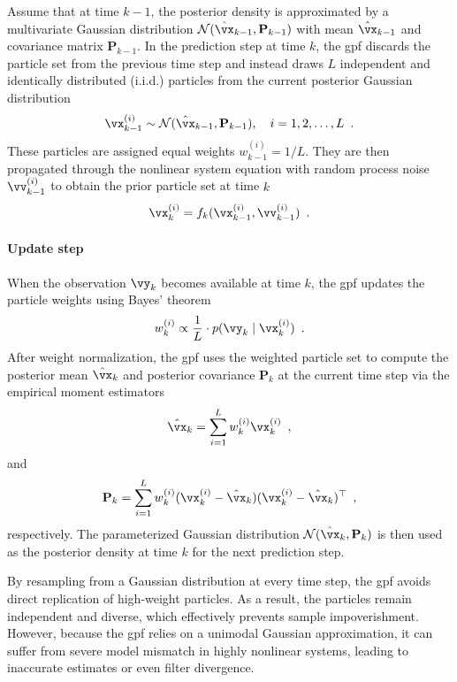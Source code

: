 Assume that at time $k-1$, the posterior density is approximated by a multivariate Gaussian distribution $\mathcal{N}(\hat{\vx}_{k-1}, \mathbf{P}_{k-1})$ with mean $\hat{\vx}_{k-1}$ and covariance matrix $\mathbf{P}_{k-1}$. In the prediction step at time $k$, the \ac{gpf} discards the particle set from the previous time step and instead draws $L$ independent and identically distributed (i.i.d.) particles from the current posterior Gaussian distribution
\begin{equation}
	\vx_{k-1}^{(i)} \sim \mathcal{N}(\hat{\vx}_{k-1}, \mathbf{P}_{k-1}), \quad i = 1, 2, \dots, L\enspace.
\end{equation}
These particles are assigned equal weights $w_{k-1}^{(i)} = 1/L$. They are then propagated through the nonlinear system equation with random process noise $\vv_{k-1}^{(i)}$ to obtain the prior particle set at time $k$
\begin{equation}
	\vx_k^{(i)} = f_k(\vx_{k-1}^{(i)}, \vv_{k-1}^{(i)})\enspace.
\end{equation}

\paragraph{Update step}

When the observation $\vy_k$ becomes available at time $k$, the \ac{gpf} updates the particle weights using Bayes' theorem
\begin{equation}
	w_k^{(i)} \propto \frac{1}{L} \cdot p(\vy_k \mid \vx_k^{(i)})\enspace.
\end{equation}
After weight normalization, the \ac{gpf} uses the weighted particle set to compute the posterior mean $\hat{\vx}_k$ and posterior covariance $\mathbf{P}_k$ at the current time step via the empirical moment estimators
\begin{equation}
	\hat{\vx}_k = \sum_{i=1}^L w_k^{(i)} \vx_k^{(i)}\enspace,
\end{equation}
and
\begin{equation}
	\mathbf{P}_k = \sum_{i=1}^L w_k^{(i)} (\vx_k^{(i)} - \hat{\vx}_k)(\vx_k^{(i)} - \hat{\vx}_k)^\top\enspace,
\end{equation}
respectively. The parameterized Gaussian distribution $\mathcal{N}(\hat{\vx}_k, \mathbf{P}_k)$ is then used as the posterior density at time $k$ for the next prediction step.

By resampling from a Gaussian distribution at every time step, the \ac{gpf} avoids direct replication of high-weight particles. As a result, the particles remain independent and diverse, which effectively prevents sample impoverishment. However, because the \ac{gpf} relies on a unimodal Gaussian approximation, it can suffer from severe model mismatch in highly nonlinear systems, leading to inaccurate estimates or even filter divergence.

